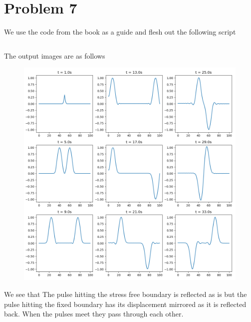 \section*{Problem 7}
We use the code from the book as a guide and flesh out the following script

\inputminted{python}{P7script.py}

\pagebreak

The output images are as follows
\begin{figure}[h]
    \centering
    \includegraphics[scale=0.55]{figures/P7output}
\end{figure}

We see that The pulse hitting the stress free boundary is reflected as is but the pulse hitting the fixed boundary has its displacement mirrored as it is reflected back. When the pulses meet they pass through each other.